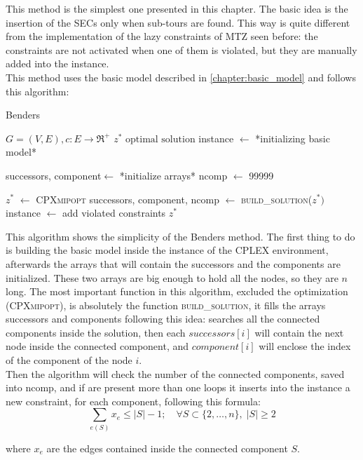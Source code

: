 This method is the simplest one presented in this chapter. The basic idea is the insertion of the SECs only when sub-tours are found. This way is quite different from the implementation of the lazy constraints of MTZ seen before: the constraints are not activated when one of them is violated, but they are manually added into the instance.\\
This method uses the basic model described in \ref{chapter:basic_model} and follows this algorithm:

\begin{algorithm}
	\caption{Benders}\label{algo:benders}
	\begin{algorithmic}[1]
		\Require $G=(V,E), c:E\rightarrow \Re^+$
		\Ensure $z^*\text{ optimal solution}$
		\State instance $\gets$ *initializing basic model*
		
		\State successors, component$\gets$ *initialize arrays*
		\State ncomp $\gets$ 99999
		
			\State $z^*$ $\gets$ \textsc{CPXmipopt}
			\State successors, component, ncomp $\gets$ \textsc{build\_solution}($z^*)$
				\State instance $\gets$ add violated constraints
			\EndIf	
		\EndWhile
		\State \Return $z^*$
	\end{algorithmic}
\end{algorithm}

This algorithm shows the simplicity of the Benders method. The first thing to do is building the basic model inside the instance of the CPLEX environment, afterwards the arrays that will contain the successors and the components are initialized. These two arrays are big enough to hold all the nodes, so they are $n$ long. The most important function in this algorithm, excluded the optimization (\textsc{CPXmipopt}), is absolutely the function \textsc{build\_solution}, it fills the arrays successors and components following this idea: searches all the connected components inside the solution, then each $successors[i]$ will contain the next node inside the connected component, and $component[i]$ will enclose the index of the component of the node $i$.\\
Then the algorithm will check the number of the connected components, saved into ncomp, and if are present more than one loops it inserts into the instance a new constraint, for each component, following this formula:
\begin{equation}
\sum_{e(S)}x_{e}\le |S|-1; \quad \forall S \subset\{2, \dots, n\}, \; |S|\ge 2
\end{equation}


where $x_e$ are the edges contained inside the connected component $S$.